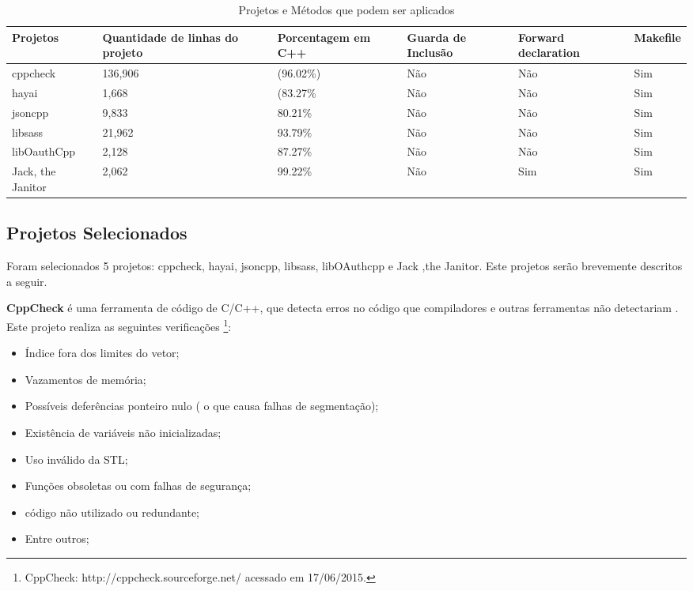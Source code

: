 \begin{table}[h]
\centering
\caption{Projetos e Métodos que podem ser aplicados}
\label{tab:projects}
\begin{tabular}{|l|p{2cm}|p{2cm}|p{2cm}|p{2cm}|p{2cm}|}
	\hline
	Projetos & Quantidade de linhas do projeto & Porcentagem em C++ &
	Guarda de Inclusão & Forward declaration & Makefile \\
	\hline
	cppcheck & 136,906 & (96.02\%) & Não & Não & Sim \\
	\hline
	hayai & 1,668 & (83.27\% & Não & Não & Sim \\
	\hline
	jsoncpp & 9,833 & 80.21\% & Não & Não & Sim \\
	\hline
	libsass & 21,962 & 93.79\% & Não & Não & Sim \\
	\hline
	libOauthCpp & 2,128 & 87.27\% & Não & Não & Sim \\
	\hline
	Jack, the Janitor & 2,062 & 99.22\% & Não & Sim & Sim \\
	\hline
\end{tabular}
\end{table}

\subsection{Projetos Selecionados}

Foram selecionados 5 projetos: cppcheck, hayai, jsoncpp, libsass,
 libOAuthcpp e Jack ,the Janitor. Este projetos serão brevemente 
descritos a seguir.

\textbf{CppCheck} é uma ferramenta de código de C/C++, que detecta erros no código
 que compiladores e outras ferramentas não detectariam . Este projeto realiza
 as seguintes verificações \footnote{CppCheck: http://cppcheck.sourceforge.net/
  acessado em 17/06/2015.}:

\begin{itemize}
	\item Índice fora dos limites do vetor;    
    \item Vazamentos de memória;
    \item Possíveis deferências ponteiro nulo ( o que causa falhas de segmentação);
	\item Existência de variáveis não inicializadas;
	\item Uso inválido da STL;
	\item Funções obsoletas ou com falhas de segurança; 
	\item código não utilizado ou redundante;
	\item Entre outros;
\end{itemize}


